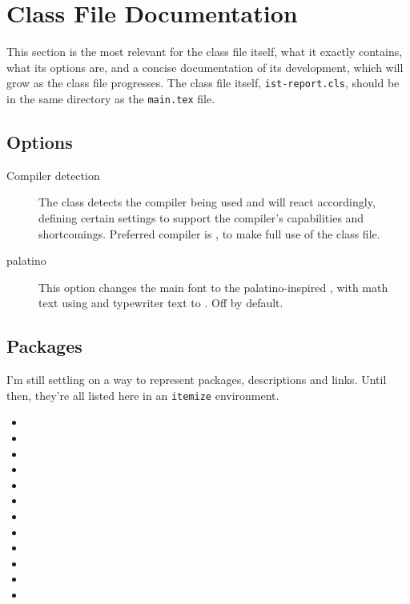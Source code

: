 \section{Class File Documentation}

This section is the most relevant for the class file itself, what it exactly contains, what its options are, and a concise documentation of its development, which will grow as the class file progresses. The class file itself, \texttt{ist-report.cls}, should be in the same directory as the \texttt{main.tex} file.

\subsection{Options}

\begin{description}
	\item[Compiler detection] The class detects the compiler being used and will react accordingly, defining certain settings to support the compiler's capabilities and shortcomings. Preferred compiler is , to make full use of the class file\footnotemark{}. 
	\item[palatino] This option changes the main font to the palatino-inspired , with math text using  and typewriter text to . Off by default.
\end{description}

\subsection{Packages}

I'm still settling on a way to represent packages, descriptions and links. Until then, they're all listed here in an \texttt{itemize} environment.
\begin{itemize}
	\item {}
	\item {}
	\item {}
	\item {}
	\item {}
	\item {}
	\item {}
	\item {}
	\item {}
	\item {}
	\item {}
	\item {}
\end{itemize}

